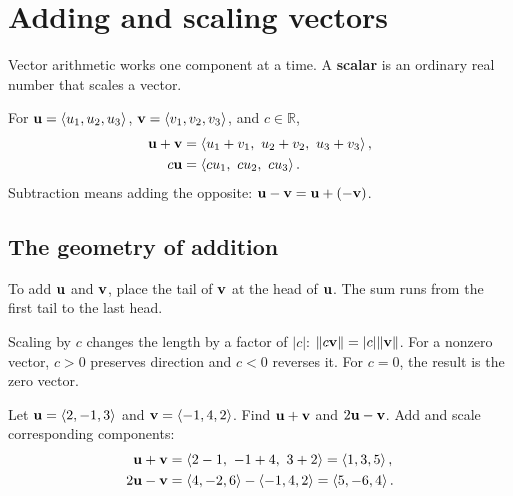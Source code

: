 \documentclass[11pt]{article}
\begin{document}
\newpage
\section{Adding and scaling vectors}
Vector arithmetic works one component at a time. A \textbf{scalar} is an
ordinary real number that scales a vector.

\begin{definition}
For $\mathbf{u}=\left\langle u_1,u_2,u_3\right\rangle$, $\mathbf{v}=\left\langle v_1,v_2,v_3\right\rangle$, and $c\in\mathbb{R}$,
\begin{align*}
 \mathbf{u}+\mathbf{v}&=\left\langle u_1+v_1,\ u_2+v_2,\ u_3+v_3\right\rangle,\\
 c\mathbf{u}&=\left\langle cu_1,\ cu_2,\ cu_3\right\rangle.
\end{align*}
Subtraction means adding the opposite: $\mathbf{u}-\mathbf{v}=\mathbf{u}+(-\mathbf{v})$.
\end{definition}

\subsection*{The geometry of addition}
To add $\mathbf{u}$ and $\mathbf{v}$, place the tail of $\mathbf{v}$ at the head of $\mathbf{u}$.
The sum runs from the first tail to the last head.

\begin{center}
\end{center}

Scaling by $c$ changes the length by a factor of $|c|$:
$\lVert c\mathbf{v}\rVert=|c|\lVert\mathbf{v}\rVert$.
For a nonzero vector, $c>0$ preserves direction and $c<0$ reverses it.
For $c=0$, the result is the zero vector.

\begin{example}{Let $\mathbf{u}=\left\langle 2,-1,3\right\rangle$ and $\mathbf{v}=\left\langle -1,4,2\right\rangle$.
Find $\mathbf{u}+\mathbf{v}$ and $2\mathbf{u}-\mathbf{v}$.}
Add and scale corresponding components:
\begin{align*}
 \mathbf{u}+\mathbf{v}&=\left\langle 2-1,\ -1+4,\ 3+2\right\rangle=\left\langle 1,3,5\right\rangle,\\
 2\mathbf{u}-\mathbf{v}&=\left\langle 4,-2,6\right\rangle-\left\langle -1,4,2\right\rangle=\left\langle 5,-6,4\right\rangle.
\end{align*}
\end{example}
\end{document}
